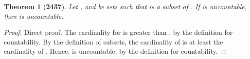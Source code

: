 \documentclass[preview]{standalone}
\newtheorem{theorem}{Theorem}
\begin{document}
\begin{theorem}[\textbf{2437}]
    Let , and \bm{$\Lambda$} be sets such that 
     is a subset of \bm{$\Lambda$}. 
    If  is uncountable, 
    then \bm{$\Lambda$} is uncountable.
\end{theorem}

\begin{proof}
    Direct proof.
    The cardinality for  is greater than ,
    by the definition for countability. 
    By the definition of subsets, 
    the cardinality of \bm{$\Lambda$} is at least the cardinality 
    of . 
    Hence, \bm{$\Lambda$} is uncountable, by the definition for countability.
\end{proof}
\end{document}
